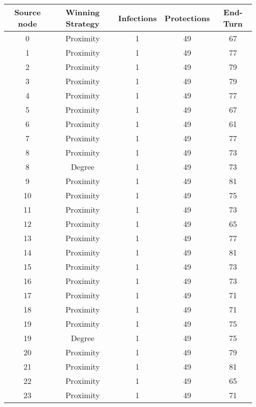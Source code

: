 \documentclass[results.tex]{subfiles}
\begin{document}
\begin{center}
  \begin{tabular}{| c || c | c | c | c |}
    \hline
    {\bfseries Source node} & {\bfseries Winning Strategy} & {\bfseries Infections} & {\bfseries Protections} & {\bfseries End-Turn} \\  %
    \hline\hline
    0 & Proximity & 1 & 49 & 67 \\ 
    \hline
    1 & Proximity & 1 & 49 & 77 \\ 
    \hline
    2 & Proximity & 1 & 49 & 79 \\ 
    \hline
    3 & Proximity & 1 & 49 & 79 \\ 
    \hline
    4 & Proximity & 1 & 49 & 77 \\ 
    \hline
    5 & Proximity & 1 & 49 & 67 \\ 
    \hline
    6 & Proximity & 1 & 49 & 61 \\ 
    \hline
    7 & Proximity & 1 & 49 & 77 \\ 
    \hline
    8 & Proximity & 1 & 49 & 73 \\ 
    \hline
    8 & Degree & 1 & 49 & 73 \\ 
    \hline
    9 & Proximity & 1 & 49 & 81 \\ 
    \hline
    10 & Proximity & 1 & 49 & 75 \\ 
    \hline
    11 & Proximity & 1 & 49 & 73 \\ 
    \hline
    12 & Proximity & 1 & 49 & 65 \\ 
    \hline
    13 & Proximity & 1 & 49 & 77 \\ 
    \hline
    14 & Proximity & 1 & 49 & 81 \\ 
    \hline
    15 & Proximity & 1 & 49 & 73 \\ 
    \hline
    16 & Proximity & 1 & 49 & 73 \\ 
    \hline
    17 & Proximity & 1 & 49 & 71 \\ 
    \hline
    18 & Proximity & 1 & 49 & 71 \\ 
    \hline
    19 & Proximity & 1 & 49 & 75 \\ 
    \hline
    19 & Degree & 1 & 49 & 75 \\ 
    \hline
    20 & Proximity & 1 & 49 & 79 \\ 
    \hline
    21 & Proximity & 1 & 49 & 81 \\ 
    \hline
    22 & Proximity & 1 & 49 & 65 \\ 
    \hline
    23 & Proximity & 1 & 49 & 71 \\ 

\end{tabular}
\end{center}
\end{document}
